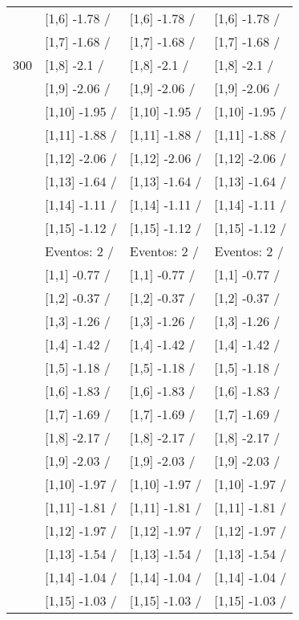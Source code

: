 \begin{table}
\begin{tabular}[t]{llll}
 & {}[1,6] -1.78  / & {}[1,6] -1.78  / & {}[1,6] -1.78  /\\
 & {}[1,7] -1.68  / & {}[1,7] -1.68  / & {}[1,7] -1.68  /\\
300 & {}[1,8] -2.1  / & {}[1,8] -2.1  / & {}[1,8] -2.1  /\\
\addlinespace
 & {}[1,9] -2.06  / & {}[1,9] -2.06  / & {}[1,9] -2.06  /\\
 & {}[1,10] -1.95  / & {}[1,10] -1.95  / & {}[1,10] -1.95  /\\
 & {}[1,11] -1.88  / & {}[1,11] -1.88  / & {}[1,11] -1.88  /\\
 & {}[1,12] -2.06  / & {}[1,12] -2.06  / & {}[1,12] -2.06  /\\
 & {}[1,13] -1.64  / & {}[1,13] -1.64  / & {}[1,13] -1.64  /\\
\addlinespace
 & {}[1,14] -1.11  / & {}[1,14] -1.11  / & {}[1,14] -1.11  /\\
 & {}[1,15] -1.12  / & {}[1,15] -1.12  / & {}[1,15] -1.12  /\\
 & Eventos:  2 / & Eventos:  2 / & Eventos:  2 /\\
 & {}[1,1] -0.77  / & {}[1,1] -0.77  / & {}[1,1] -0.77  /\\
 & {}[1,2] -0.37  / & {}[1,2] -0.37  / & {}[1,2] -0.37  /\\
\addlinespace
 & {}[1,3] -1.26  / & {}[1,3] -1.26  / & {}[1,3] -1.26  /\\
 & {}[1,4] -1.42  / & {}[1,4] -1.42  / & {}[1,4] -1.42  /\\
 & {}[1,5] -1.18  / & {}[1,5] -1.18  / & {}[1,5] -1.18  /\\
 & {}[1,6] -1.83  / & {}[1,6] -1.83  / & {}[1,6] -1.83  /\\
 & {}[1,7] -1.69  / & {}[1,7] -1.69  / & {}[1,7] -1.69  /\\
\addlinespace
500 & {}[1,8] -2.17  / & {}[1,8] -2.17  / & {}[1,8] -2.17  /\\
 & {}[1,9] -2.03  / & {}[1,9] -2.03  / & {}[1,9] -2.03  /\\
 & {}[1,10] -1.97  / & {}[1,10] -1.97  / & {}[1,10] -1.97  /\\
 & {}[1,11] -1.81  / & {}[1,11] -1.81  / & {}[1,11] -1.81  /\\
 & {}[1,12] -1.97  / & {}[1,12] -1.97  / & {}[1,12] -1.97  /\\
\addlinespace
 & {}[1,13] -1.54  / & {}[1,13] -1.54  / & {}[1,13] -1.54  /\\
 & {}[1,14] -1.04  / & {}[1,14] -1.04  / & {}[1,14] -1.04  /\\
 & {}[1,15] -1.03  / & {}[1,15] -1.03  / & {}[1,15] -1.03  /\\
\bottomrule
\end{tabular}
\end{table}
